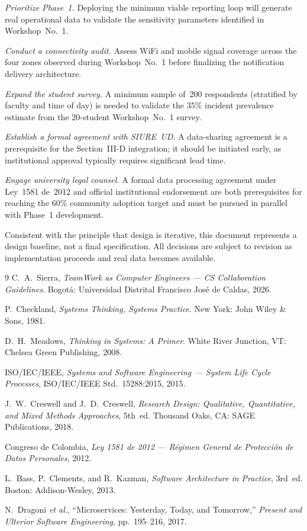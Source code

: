 \documentclass[10pt,twocolumn]{article}
\begin{document}
\textit{Prioritize Phase~1.} Deploying the minimum viable reporting
loop will generate real operational data to validate the sensitivity
parameters identified in Workshop~No.~1.

\textit{Conduct a connectivity audit.} Assess WiFi and mobile signal
coverage across the four zones observed during Workshop~No.~1 before
finalizing the notification delivery architecture.

\textit{Expand the student survey.} A minimum sample of~200 respondents
(stratified by faculty and time of day) is needed to validate the 35\%
incident prevalence estimate from the 20-student Workshop~No.~1 survey.

\textit{Establish a formal agreement with SIURE~UD.} A data-sharing
agreement is a prerequisite for the Section~III-D integration; it should
be initiated early, as institutional approval typically requires
significant lead time.

\textit{Engage university legal counsel.} A formal data processing
agreement under Ley~1581 de~2012 and official institutional endorsement
are both prerequisites for reaching the 60\% community adoption target
and must be pursued in parallel with Phase~1 development.

Consistent with the principle that design is iterative, this document
represents a design baseline, not a final specification. All decisions
are subject to revision as implementation proceeds and real data becomes
available.

\begin{thebibliography}{9}
C.~A.~Sierra,
\textit{TeamWork as Computer Engineers --- CS Collaboration Guidelines}.
Bogot\'a: Universidad Distrital Francisco Jos\'e de Caldas, 2026.

P.~Checkland,
\textit{Systems Thinking, Systems Practice}.
New York: John Wiley \& Sons, 1981.

D.~H.~Meadows,
\textit{Thinking in Systems: A Primer}.
White River Junction, VT: Chelsea Green Publishing, 2008.

ISO/IEC/IEEE,
\textit{Systems and Software Engineering --- System Life Cycle
Processes}, ISO/IEC/IEEE Std.~15288:2015, 2015.

J.~W.~Creswell and J.~D.~Creswell,
\textit{Research Design: Qualitative, Quantitative, and Mixed Methods
Approaches}, 5th~ed.
Thousand Oaks, CA: SAGE Publications, 2018.

Congreso de Colombia,
\textit{Ley 1581 de 2012 --- R\'egimen General de Protecci\'on de Datos
Personales}, 2012.

L.~Bass, P.~Clements, and R.~Kazman,
\textit{Software Architecture in Practice}, 3rd~ed.
Boston: Addison-Wesley, 2013.

N.~Dragoni \textit{et al.},
``Microservices: Yesterday, Today, and Tomorrow,''
\textit{Present and Ulterior Software Engineering},
pp.~195--216, 2017.
\end{thebibliography}
\end{document}
